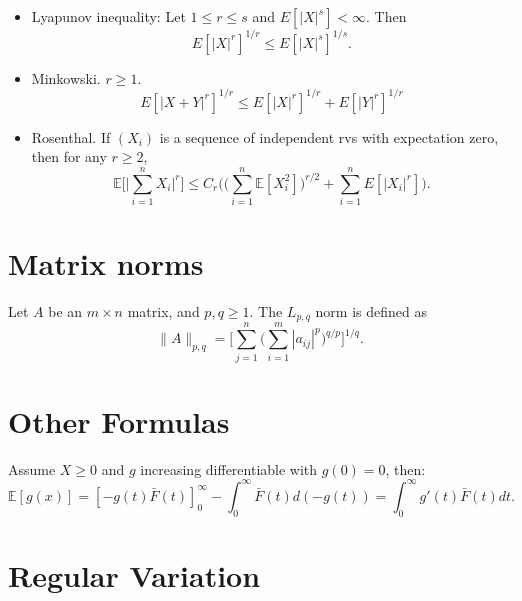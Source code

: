 \documentclass[11pt,reqno]{amsart}
\newcommand{\E}{\mathbb{E}}
\newcommand{\1}{\mathds{1}}
\newcommand{\Fo}{\bar{F}}
\newcommand{\0}{\boldsymbol{0}}
\newcommand{\4}{\mathchoice{\mskip1.5mu}{\mskip1.5mu}{}{}}
\newcommand{\5}{\mathchoice{\mskip-1.5mu}{\mskip-1.5mu}{}{}}
\newcommand{\2}{\penalty250\mskip\thickmuskip\mskip-\thinmuskip} %
\begin{document}
\begin{itemize}
\item Lyapunov inequality: Let $1 \le r  \le s$ and $E[|X|^s] <\infty$. Then
\begin{equation*}
E[|X|^r]^{1/r} \le E[|X|^s]^{1/s}.
\end{equation*}

\item Minkowski. $r\ge 1$.
\begin{equation*}
E[|X+Y|^r]^{1/r}\le E[|X|^r]^{1/r}+E[|Y|^r]^{1/r}
\end{equation*}

\item Rosenthal. If $(X_i)$ is a sequence of independent rvs with expectation zero, then for any $r\ge 2$,
\begin{equation*}
\E \Big[  \Big|\sum_{i=1}^n X_i \Big|^r \Big] \le C_r \Big( \Big(\sum_{i=1}^n \E[X_i^2] \Big)^{r/2} + \sum_{i=1}^n E[|X_i|^r] \Big).
\end{equation*}
%
\end{itemize}

\section{Matrix norms}

Let $A$ be an $m\times n$ matrix, and $p,q \ge 1$. The $L_{p,q}$ norm is defined as
\begin{equation*}
\| A\|_{p,q} = \Big[ \sum_{j=1}^n \Big( \sum_{i=1}^m |a_{ij}|^p \Big)^{q/p} \Big]^{1/q}.
\end{equation*}


\section{Other Formulas}

Assume $X\geq 0$ and $g$ increasing differentiable with $g(0)=0$, then:
\begin{equation*}
\E[g(x)]= [-g(t) \Fo(t)]_0^\infty - \int_0^\infty \Fo(t) d(-g(t))=\int_0^\infty g'(t) \Fo(t) dt.
\end{equation*}

\section{Regular Variation}
\end{document}
